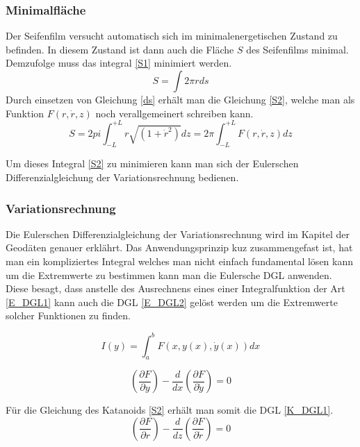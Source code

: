 \begin{refsection}
\subsubsection{Minimalfläche}
Der Seifenfilm versucht automatisch sich im minimalenergetischen Zustand zu befinden. In diesem Zustand ist dann auch die Fläche $S$ des Seifenfilms minimal.
Demzufolge muss das integral \eqref{S1} minimiert werden. 
\begin{equation} \label{S1}  
  S= \int 2 \pi r ds 
\end{equation}
Durch einsetzen von Gleichung \eqref{ds} erhält man die Gleichung \eqref{S2}, welche man als Funktion $F(r,\dot r, z)$ noch verallgemeinert schreiben kann.
\begin{equation} \label{S2}
  S=2 pi \int_{-L}^{+L} r\sqrt{(1+\dot r^2)}dz =2 \pi \int_{-L}^{+L}  F(r,\dot r, z) dz 
\end{equation}


Um dieses Integral \eqref{S2} zu minimieren kann man sich der Eulerschen Differenzialgleichung der Variationsrechnung bedienen. 
\subsubsection{Variationsrechnung}
Die Eulerschen Differenzialgleichung der Variationsrechnung wird im Kapitel der Geodäten genauer erklährt.
Das Anwendungsprinzip kuz zusammengefast ist, hat man ein kompliziertes Integral welches man nicht einfach fundamental lösen kann um die Extremwerte zu bestimmen kann man die Eulersche DGL anwenden. Diese besagt, dass anstelle des Ausrechnens eines einer Integralfunktion der Art \eqref{E_DGL1} kann auch die DGL \eqref{E_DGL2} gelöst werden um die Extremwerte solcher Funktionen zu finden.

\begin{equation} \label{E_DGL1}  
  I(y)= \int_a^b F(x,y(x),\dot y(x))dx       
\end{equation}

\begin{equation} \label{E_DGL2}
\left(\frac{\partial F}{\partial y}\right)- \frac{d}{dx} \left(\frac{\partial F}{\partial \dot{y}}\right)=0         
\end{equation}

Für die Gleichung des Katanoids \eqref{S2} erhält man somit die DGL \eqref{K_DGL1}.
\begin{equation} \label{K_DGL1}
\left(\frac{\partial F}{\partial r}\right)- \frac{d}{dz} \left(\frac{\partial F}{\partial \dot{r}}\right)=0    
\end{equation}


\end{refsection}
